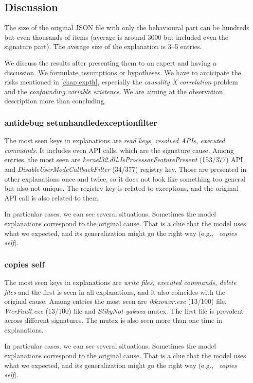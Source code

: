 \subsection{Discussion}
The size of the original JSON file with only the behavioural part can be hundreds but even thousands of items (average is around $3000$ but included even the signature part). The average size of the explanation is 3--5 entries.

We discuss the results after presenting them to an expert and having a discussion. We formulate assumptions or hypotheses. We have to anticipate the risks mentioned in \ref{chap:expth}, especially the \emph{causality X correlation} problem and the \emph{confounding variable existence}. We are aiming at the observation description more than concluding.

\subsubsection*{antidebug setunhandledexceptionfilter}
The most seen keys in explanations are \emph{read keys, resolved APIs, executed commands}. It includes even API calls, which are the signature cause. Among entries, the most seen are \emph{kernel32.dll.IsProcessorFeaturePresent} (153/377) API and \emph{DisableUserModeCallbackFilter} (34/377) registry key. Those are presented in other explanations once and twice, so it does not look like something too general but also not unique. The registry key is related to exceptions, and the original API call is also related to them.

In particular cases, we can see several situations. Sometimes the model explanations correspond to the original cause. That is a clue that the model uses what we expected, and its generalization might go the right way (e.g., \ \emph{copies self}).

\subsubsection*{copies self}
The most seen keys in explanations are \emph{write files, executed commands, delete files} and the first is seen in all explanations, and it also coincides with the original cause. Among entries the most seen are \emph{ikkzowxr.exe} (13/100) file, \emph{WerFault.exe} (13/100) file and \emph{StikyNot yakuza} mutex. The first file is prevalent across different signatures. The mutex is also seen more than one time in explanations.

In particular cases, we can see several situations. Sometimes the model explanations correspond to the original cause. That is a clue that the model uses what we expected, and its generalization might go the right way (e.g., \ \emph{copies self}).


